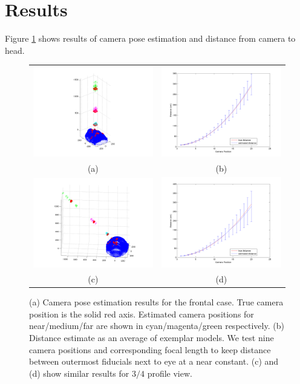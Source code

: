\documentclass[runningheads]{llncs}
\begin{document}
\section{Results}
Figure \ref{fig:results} shows results of camera pose estimation and distance from camera to head.  
\begin{figure}[ht]
\begin{tabular}{cc}
\includegraphics[width=.45\linewidth]{resources/figures/cameraloc_frontal.png} &
\includegraphics[width=.45\linewidth]{resources/figures/errorbar_frontal.png} \\
(a) & (b) \\
\includegraphics[width=.45\linewidth]{resources/figures/cameraloc_3q.png} &
\includegraphics[width=.45\linewidth]{resources/figures/errorbar_3q.png} \\
(c) & (d)
\end{tabular}
\caption{(a) Camera pose estimation results for the frontal case.  True camera position is the solid red axis.  Estimated camera positions for near/medium/far are shown in cyan/magenta/green respectively.   (b) Distance estimate as an average of exemplar models.  We test nine camera positions and corresponding focal length to keep distance between outermost fiducials next to eye at a near constant. (c) and (d) show similar results for $3/4$ profile view.}
\label{fig:results}
\end{figure}
\end{document}
